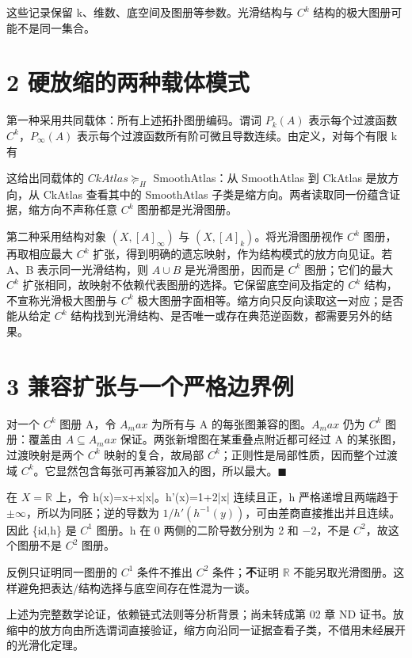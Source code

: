 \documentclass[UTF8,a4paper,zihao=-4,fontset=windows,openany]{ctexbook}
\newcommand{\mcsdisplay}[1]{%
  \par\addvspace{0.7em}%
  \sbox{\mcsmathbox}{\ensuremath{\displaystyle #1}}%
  \ifdim\wd\mcsmathbox>\linewidth
    \noindent\resizebox{\linewidth}{!}{\usebox{\mcsmathbox}}%
  \else
    \noindent\hspace*{\fill}\usebox{\mcsmathbox}\hspace*{\fill}%
  \fi
  \par\addvspace{0.7em}%
}
\def\ensuremath#1{#1}%
\def\mathrm#1{#1}%
\begin{document}
这些记录保留 k、维数、底空间及图册等参数。光滑结构与 \(C^k\) 结构的极大图册可能不是同一集合。

\section{2 硬放缩的两种载体模式}
第一种采用共同载体：所有上述拓扑图册编码。谓词 \(P_k(A)\) 表示每个过渡函数 \(C^k\)，\(P_\infty(A)\) 表示每个过渡函数所有阶可微且导数连续。由定义，对每个有限 k 有


\mcsdisplay{P_\infty(A)\Rightarrow P_k(A).}
\noindent 这给出同载体的 \(\mathrm{CkAtlas}\succeq_H\) SmoothAtlas：从 SmoothAtlas 到 CkAtlas 是放方向，从 CkAtlas 查看其中的 SmoothAtlas 子类是缩方向。两者读取同一份蕴含证据，缩方向不声称任意 \(C^k\) 图册都是光滑图册。

第二种采用结构对象 \((X,[A]_\infty)\) 与 \((X,[A]_k)\)。将光滑图册视作 \(C^k\) 图册，再取相应最大 \(C^k\) 扩张，得到明确的遗忘映射，作为结构模式的放方向见证。若 A、B 表示同一光滑结构，则 \(A\cup B\) 是光滑图册，因而是 \(C^k\) 图册；它们的最大 \(C^k\) 扩张相同，故映射不依赖代表图册的选择。它保留底空间及指定的 \(C^k\) 结构，不宣称光滑极大图册与 \(C^k\) 极大图册字面相等。缩方向只反向读取这一对应；是否能从给定 \(C^k\) 结构找到光滑结构、是否唯一或存在典范逆函数，都需要另外的结果。

\section{3 兼容扩张与一个严格边界例}
对一个 \(C^k\) 图册 A，令 \(A_\mathrm{max}\) 为所有与 A 的每张图兼容的图。\(A_\mathrm{max}\) 仍为 \(C^k\) 图册：覆盖由 \(A\subseteq A_\mathrm{max}\) 保证。两张新增图在某重叠点附近都可经过 A 的某张图，过渡映射是两个 \(C^k\) 映射的复合，故局部 \(C^k\)；正则性是局部性质，因而整个过渡域 \(C^k\)。它显然包含每张可再兼容加入的图，所以最大。\(\blacksquare\)

在 \(X=\mathbb{R}\) 上，令 h(x)=x+x|x|。h'(x)=1+2|x| 连续且正，h 严格递增且两端趋于 \(\pm\infty\)，所以为同胚；逆的导数为 \(1/h'(h^{-1}(y))\)，可由差商直接推出并且连续。因此 \{id,h\} 是 \(C^{1}\) 图册。h 在 0 两侧的二阶导数分别为 2 和 \(-2\)，不是 \(C^{2}\)，故这个图册不是 \(C^{2}\) 图册。

反例只证明同一图册的 \(C^{1}\) 条件不推出 \(C^{2}\) 条件；\textbf{不}证明 \(\mathbb{R}\) 不能另取光滑图册。这样避免把表达/结构选择与底空间存在性混为一谈。

上述为完整数学论证，依赖链式法则等分析背景；尚未转成第 02 章 ND 证书。放缩中的放方向由所选谓词直接验证，缩方向沿同一证据查看子类，不借用未经展开的光滑化定理。
\end{document}
